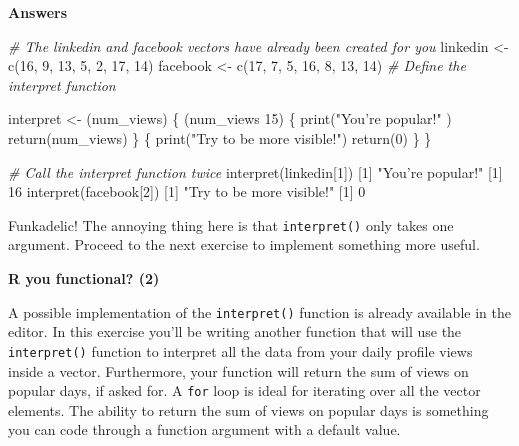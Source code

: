 \documentclass[]{article}
\newcommand{\hlnum}[1]{\textcolor[rgb]{0.816,0.125,0.439}{#1}}%
\newcommand{\hlstr}[1]{\textcolor[rgb]{0.251,0.627,0.251}{#1}}%
\newcommand{\hlcom}[1]{\textcolor[rgb]{0.502,0.502,0.502}{\textit{#1}}}%
\newcommand{\hlstd}[1]{\textcolor[rgb]{0.251,0.251,0.251}{#1}}%
\newcommand{\hlkwd}[1]{\textcolor[rgb]{0.878,0.439,0.125}{#1}}%
\newenvironment{Shaded}{\begin{myshaded}}{\end{myshaded}}
\newcommand{\KeywordTok}[1]{\hlkwd{#1}}
\newcommand{\DecValTok}[1]{\hlnum{#1}}
\newcommand{\StringTok}[1]{\hlstr{#1}}
\newcommand{\CommentTok}[1]{\hlcom{#1}}
\newcommand{\NormalTok}[1]{\hlstd{#1}}
\begin{document}
\textbf{Answers}

\begin{Shaded}
\begin{Highlighting}[]
\CommentTok{# The linkedin and facebook vectors have already been created for you}
\NormalTok{linkedin <-}\StringTok{ }\KeywordTok{c}\NormalTok{(}\DecValTok{16}\NormalTok{, }\DecValTok{9}\NormalTok{, }\DecValTok{13}\NormalTok{, }\DecValTok{5}\NormalTok{, }\DecValTok{2}\NormalTok{, }\DecValTok{17}\NormalTok{, }\DecValTok{14}\NormalTok{)}
\NormalTok{facebook <-}\StringTok{ }\KeywordTok{c}\NormalTok{(}\DecValTok{17}\NormalTok{, }\DecValTok{7}\NormalTok{, }\DecValTok{5}\NormalTok{, }\DecValTok{16}\NormalTok{, }\DecValTok{8}\NormalTok{, }\DecValTok{13}\NormalTok{, }\DecValTok{14}\NormalTok{)}
\CommentTok{# Define the interpret function}

\NormalTok{interpret <-}\StringTok{ }\NormalTok{(num_views) \{}
\NormalTok{ (num_views }\OperatorTok{>}\StringTok{ }\DecValTok{15}\NormalTok{) \{}
\KeywordTok{print}\NormalTok{(}\StringTok{"You're popular!"}\NormalTok{ )}
\KeywordTok{return}\NormalTok{(num_views)}
\NormalTok{\} }\NormalTok{ \{}
\KeywordTok{print}\NormalTok{(}\StringTok{"Try to be more visible!"}\NormalTok{)}
\KeywordTok{return}\NormalTok{(}\DecValTok{0}\NormalTok{)}
\NormalTok{\}}
\NormalTok{\}}

\CommentTok{# Call the interpret function twice}
\KeywordTok{interpret}\NormalTok{(linkedin[}\DecValTok{1}\NormalTok{])}
\NormalTok{   [}\DecValTok{1}\NormalTok{] }\StringTok{"You're popular!"}
\NormalTok{   [}\DecValTok{1}\NormalTok{] }\DecValTok{16}
\KeywordTok{interpret}\NormalTok{(facebook[}\DecValTok{2}\NormalTok{])}
\NormalTok{   [}\DecValTok{1}\NormalTok{] }\StringTok{"Try to be more visible!"}
\NormalTok{   [}\DecValTok{1}\NormalTok{] }\DecValTok{0}
\end{Highlighting}
\end{Shaded}

Funkadelic! The annoying thing here is that \texttt{interpret()} only
takes one argument. Proceed to the next exercise to implement something
more useful.

\textbf{R you functional? (2)}

A possible implementation of the \texttt{interpret()} function is
already available in the editor. In this exercise you'll be writing
another function that will use the \texttt{interpret()} function to
interpret all the data from your daily profile views inside a vector.
Furthermore, your function will return the sum of views on popular days,
if asked for. A \texttt{for} loop is ideal for iterating over all the
vector elements. The ability to return the sum of views on popular days
is something you can code through a function argument with a default
value.
\end{document}
